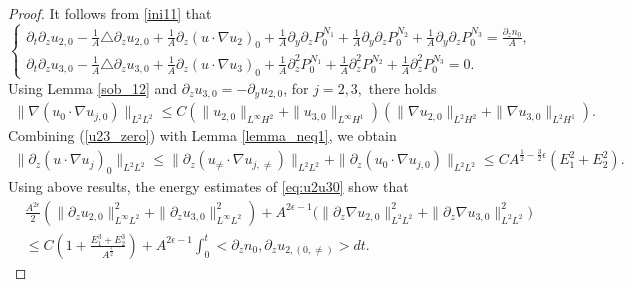 \documentclass[10pt,a4paper]{amsart}
\begin{document}
\begin{proof}
		It follows from \eqref{ini11} that 
		\begin{equation}\label{eq:u2u30}
			\left\{
			\begin{array}{lr}
				\partial_t\partial_zu_{2,0}-\frac{1}{A}\triangle \partial_zu_{2,0}
				+\frac{1}{A}\partial_z(u\cdot\nabla u_{2})_0
				+\frac{1}{A}\partial_y\partial_zP^{N_1}_0
				+\frac{1}{A}\partial_y\partial_z P^{N_2}_0+\frac{1}{A}\partial_y\partial_z P^{N_3}_0=\frac{\partial_zn_0}{A}, \\
				\partial_t\partial_zu_{3,0}-\frac{1}{A}\triangle\partial_z u_{3,0}
				+\frac{1}{A}\partial_z(u\cdot\nabla u_3)_0
				+\frac{1}{A}\partial_z^2P^{N_1}_0
				+\frac{1}{A}\partial_z^2 P^{N_2}_0
				+\frac{1}{A}\partial_z^2 P^{N_3}_0=0.
			\end{array}
			\right.
		\end{equation}
		Using Lemma \ref{sob_12} and $\partial_zu_{3,0}=-\partial_yu_{2,0}$, 
		for $j=2,3,$
		there holds
		\begin{equation}\label{u23_zero}
			\begin{aligned}	
				\|\nabla(u_{0}\cdot\nabla u_{j,0})\|_{L^2L^2}
				\leq C(\|u_{2,0}\|_{L^{\infty}H^2}+\|u_{3,0}\|_{L^{\infty}H^1})
				(\|\nabla
				u_{2,0}\|_{L^{2}H^2}+\|\nabla u_{3,0}\|_{L^{2}H^1}).
			\end{aligned}
		\end{equation}
		Combining (\ref{u23_zero}) with Lemma \ref{lemma_neq1}, we obtain
		\begin{equation}\label{u23_zero_1}
			\begin{aligned}
				\|\partial_z(u\cdot\nabla u_j)_0\|_{L^2L^2}\leq
				\|\partial_z(u_{\neq}\cdot\nabla u_{j,\neq})\|_{L^2L^2}
				+\|\partial_z(u_{0}\cdot\nabla u_{j,0})\|_{L^2L^2}
				\leq CA^{\frac12-\frac32\epsilon}(E_1^2+E_2^2).
			\end{aligned}
		\end{equation}
		Using  above results, the 
		energy estimates of \eqref{eq:u2u30} show that 
		\begin{equation}\label{u0_ans1}
			\begin{aligned}
				&\frac{A^{2\epsilon}}{2}(\|\partial_z u_{2,0}\|_{L^{\infty}L^2}^2+\|\partial_z u_{3,0}\|_{L^{\infty}L^2}^2)
				+A^{2\epsilon-1}\Big(
				\|\partial_z\nabla u_{2,0}\|_{L^2L^2}^2
				+\|\partial_z\nabla u_{3,0}\|_{L^2L^2}^2\Big)\\
				&\leq C\left(1+\frac{E_1^3+E_2^3}{A^{\frac{\epsilon}{2}}}\right)
				+A^{2\epsilon-1}
				\int_0^t<\partial_zn_{0},\partial_zu_{2,(0,\neq)}>dt.
			\end{aligned}

\end{equation}
\end{proof}
\end{document}
